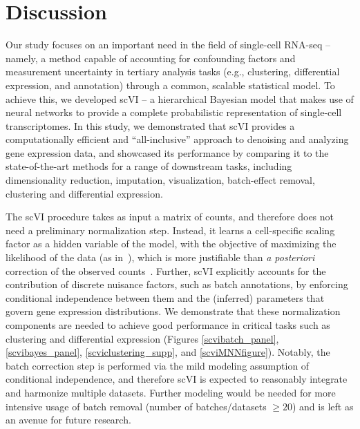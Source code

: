 \section{Discussion}

Our study focuses on an important need in the field of single-cell RNA-seq -- namely, a method capable of accounting for confounding factors and measurement uncertainty in tertiary analysis tasks (e.g., clustering, differential expression, and annotation) through a common, scalable statistical model. To achieve this, we developed scVI -- a hierarchical Bayesian model that makes use of neural networks to provide a complete probabilistic representation of single-cell transcriptomes. In this study, we demonstrated that scVI provides a computationally efficient and ``all-inclusive'' approach to denoising and analyzing gene expression data, and showcased its performance by comparing it to the state-of-the-art methods for a range of downstream tasks, including dimensionality reduction, imputation, visualization, batch-effect removal, clustering and differential expression.  

The scVI procedure takes as input a matrix of counts, and therefore does not need a preliminary normalization step. Instead, it learns a cell-specific scaling factor as a hidden variable of the model, with the objective of maximizing the likelihood of the data (as in~\cite{biscuit,zinbwave,basics}), which is more justifiable than \emph{a posteriori} correction of the observed counts~\cite{vallejos2017normalizing}. Further, scVI explicitly accounts for the contribution of discrete nuisance factors, such as batch annotations, by enforcing conditional independence between them and the (inferred) parameters that govern gene expression distributions. We demonstrate that these normalization components are needed to achieve good performance in critical tasks such as clustering and differential expression (Figures \ref{scvibatch_panel}, \ref{scvibayes_panel}, \ref{scviclustering_supp}, and \ref{scviMNNfigure}). Notably, the batch correction step is performed via the mild modeling assumption of conditional independence, and therefore scVI is expected to reasonably integrate and harmonize multiple datasets. Further modeling would be needed for more intensive usage of batch removal (number of batches/datasets $\geq 20$) and is left as an avenue for future research. 

